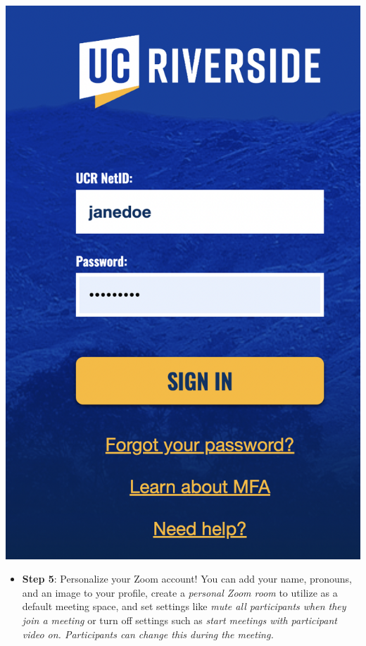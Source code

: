 \documentclass[
]{book}
\providecommand{\tightlist}{%
  \setlength{\itemsep}{0pt}\setlength{\parskip}{0pt}}
\begin{document}
\begin{center}\includegraphics[width=10.81in]{images/zoomcred} \end{center}

\begin{itemize}
\tightlist
\item
  \textbf{Step 5}: Personalize your Zoom account! You can add your name, pronouns, and an image to your profile, create a \emph{personal Zoom room} to utilize as a default meeting space, and set settings like \emph{mute all participants when they join a meeting} or turn off settings such as \emph{start meetings with participant video on. Participants can change this during the meeting.}
\end{itemize}
\end{document}
